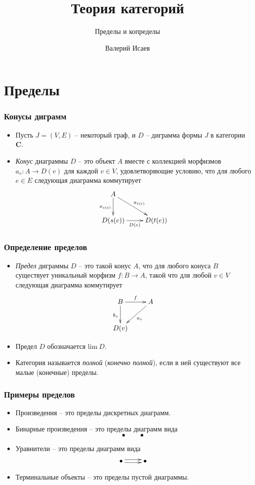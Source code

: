\documentclass{beamer}
\theoremstyle{definition}
\newcommand{\cat}[1]{\mathbf{#1}}
\renewcommand{\C}{\cat{C}}
\begin{document}
\title{Теория категорий}
\subtitle{Пределы и копределы}
\author{Валерий Исаев}
\maketitle

\section{Пределы}

\begin{frame}
\frametitle{Конусы диграмм}
\begin{itemize}
\item Пусть $J = (V,E)$ -- некоторый граф, и $D$ -- диграмма формы $J$ в категории $\C$.
\item \emph{Конус} диаграммы $D$ -- это объект $A$ вместе с коллекцией морфизмов $a_v : A \to D(v)$ для каждой $v \in V$, удовлетворяющие условию, что для любого $e \in E$ следующая диаграмма коммутирует
\[ \xymatrix{ A \ar[d]_{a_{s(e)}} \ar[rd]^{a_{t(e)}} \\
              D(s(e)) \ar[r]_{D(e)} & D(t(e))
            } \]
\end{itemize}
\end{frame}

\begin{frame}
\frametitle{Определение пределов}
\begin{itemize}
\item \emph{Предел} диграммы $D$ -- это такой конус $A$, что для любого конуса $B$ существует уникальный морфизм $f : B \to A$, такой что для любой $v \in V$ следующая диаграмма коммутирует
\[ \xymatrix{ B \ar[d]_{b_v} \ar[r]^f & A \ar[dl]^{a_v} \\
              D(v)
            } \]
\item Предел $D$ обозначается $\mathrm{lim}\ D$.
\item Категория называется \emph{полной} (\emph{конечно полной}), если в ней существуют все малые (конечные) пределы.
\end{itemize}
\end{frame}

\begin{frame}
\frametitle{Примеры пределов}
\begin{itemize}
\item Произведения -- это пределы дискретных диаграмм.
\item Бинарные произведения -- это пределы диаграмм вида \[ \bullet \qquad \bullet \]
\item Уравнители -- это пределы диаграмм вида
\[ \xymatrix{ \bullet \ar@<-.5ex>[r] \ar@<.5ex>[r] & \bullet } \]
\item Терминальные объекты -- это пределы пустой диаграммы.
\end{itemize}
\end{frame}
\end{document}
